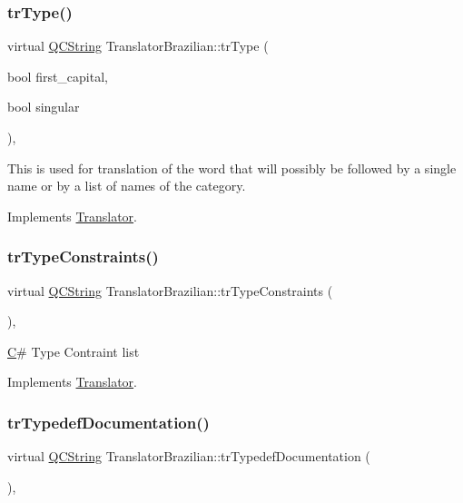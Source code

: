 \subsubsection{\texorpdfstring{trType()}{trType()}}
{\footnotesize\ttfamily virtual \mbox{\hyperlink{class_q_c_string}{Q\+C\+String}} Translator\+Brazilian\+::tr\+Type (\begin{DoxyParamCaption}\item[{bool}]{first\+\_\+capital,  }\item[{bool}]{singular }\end{DoxyParamCaption})\hspace{0.3cm}{\ttfamily [inline]}, {\ttfamily [virtual]}}

This is used for translation of the word that will possibly be followed by a single name or by a list of names of the category. 

Implements \mbox{\hyperlink{class_translator}{Translator}}.

\mbox{\label{class_translator_brazilian_ada31951456515447b66c7278539d0759}} 
\subsubsection{\texorpdfstring{trTypeConstraints()}{trTypeConstraints()}}
{\footnotesize\ttfamily virtual \mbox{\hyperlink{class_q_c_string}{Q\+C\+String}} Translator\+Brazilian\+::tr\+Type\+Constraints (\begin{DoxyParamCaption}{ }\end{DoxyParamCaption})\hspace{0.3cm}{\ttfamily [inline]}, {\ttfamily [virtual]}}

\mbox{\hyperlink{class_c}{C}}\# Type Contraint list 

Implements \mbox{\hyperlink{class_translator}{Translator}}.

\mbox{\label{class_translator_brazilian_a79a0f72b0f981ec8df768bca5636260d}} 
\subsubsection{\texorpdfstring{trTypedefDocumentation()}{trTypedefDocumentation()}}
{\footnotesize\ttfamily virtual \mbox{\hyperlink{class_q_c_string}{Q\+C\+String}} Translator\+Brazilian\+::tr\+Typedef\+Documentation (\begin{DoxyParamCaption}{ }\end{DoxyParamCaption})\hspace{0.3cm}{\ttfamily [inline]}, {\ttfamily [virtual]}}

